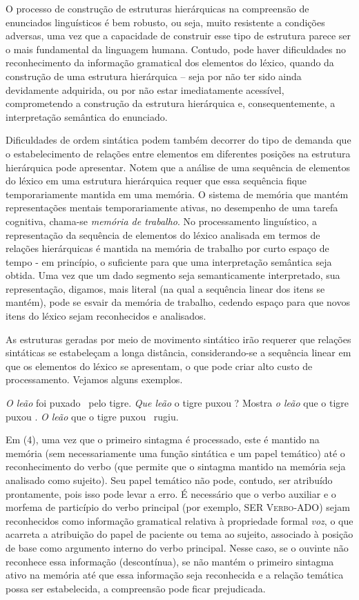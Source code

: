 \documentclass[output=paper,colorlinks,citecolor=brown,booklanguage=portuguese]{langscibook}
\begin{document}
O processo de construção de estruturas hierárquicas na compreensão de enunciados linguísticos é bem robusto, ou seja, muito resistente a condições adversas, uma vez que a capacidade de construir esse tipo de estrutura parece ser o mais fundamental da linguagem humana. Contudo, pode haver dificuldades no reconhecimento da informação gramatical dos elementos do léxico, quando da construção de uma estrutura hierárquica – seja por não ter sido ainda devidamente adquirida, ou por não estar imediatamente acessível, comprometendo a construção da estrutura hierárquica e, consequentemente, a interpretação semântica do enunciado.

Dificuldades de ordem sintática podem também decorrer do tipo de demanda que o estabelecimento de relações entre elementos em diferentes posições na estrutura hierárquica pode apresentar. Notem que a análise de uma sequência de elementos do léxico em uma estrutura hierárquica requer que essa sequência fique temporariamente mantida em uma memória. O sistema de memória que mantém representações mentais temporariamente ativas, no desempenho de uma tarefa cognitiva, chama-se \emph{memória de trabalho}. No processamento linguístico, a representação da sequência de elementos do léxico analisada em termos de relações hierárquicas é mantida na memória de trabalho por curto espaço de tempo -  em princípio, o suficiente para que uma interpretação semântica seja obtida. Uma vez que um dado segmento seja semanticamente interpretado, sua representação, digamos, mais literal (na qual a sequência linear dos itens se mantém), pode se esvair da memória de trabalho, cedendo espaço para que novos itens do léxico sejam reconhecidos e analisados.

As estruturas geradas por meio de movimento sintático irão requerer que relações sintáticas se estabeleçam a longa distância, considerando-se a sequência linear em que os elementos do léxico se apresentam, o que pode criar alto custo de processamento. Vejamos alguns exemplos.

\ea\label{ex:14:4}	\emph{O leão} foi puxado \longrule ~pelo tigre.
\z
\ea\label{ex:14:5}	\emph{Que leão} o tigre puxou \longrule?
\z
\ea\label{ex:14:6} 	Mostra \emph{o leão} que o tigre puxou \longrule.
\z
\ea\label{ex:14:7}	\emph{O leão} que o tigre puxou \longrule ~rugiu.
\z

Em (4), uma vez que o primeiro sintagma é processado, este é mantido na memória (sem necessariamente uma função sintática e um papel temático) até o reconhecimento do verbo (que permite que o sintagma mantido na memória seja analisado como sujeito). Seu papel temático não pode, contudo, ser atribuído prontamente, pois isso pode levar a erro. É necessário que o verbo auxiliar e o morfema de particípio do verbo principal (por exemplo, SER  \textsc{Verbo}-ADO) sejam reconhecidos como informação gramatical relativa à propriedade formal \emph{voz}, o que acarreta a atribuição do papel de paciente ou tema ao sujeito, associado à posição de base como argumento interno do verbo principal. Nesse caso, se o ouvinte não reconhece essa informação (descontínua), se não mantém o primeiro sintagma ativo na memória até que essa informação seja reconhecida e a relação temática possa ser estabelecida, a compreensão pode ficar prejudicada. 
\end{document}
